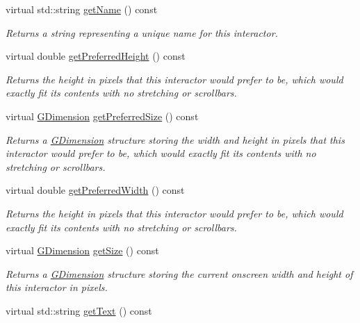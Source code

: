 \begin{DoxyCompactItemize}
virtual std\+::string \mbox{\hyperlink{classsgl_1_1GInteractor_a8a60438a5b55d0b2ceb35c8674b9d8c5}{get\+Name}} () const
\begin{DoxyCompactList}\small\item\em Returns a string representing a unique name for this interactor. \end{DoxyCompactList}\item 
virtual double \mbox{\hyperlink{classsgl_1_1GInteractor_a747de0961653847bdc6615dbf756d715}{get\+Preferred\+Height}} () const
\begin{DoxyCompactList}\small\item\em Returns the height in pixels that this interactor would prefer to be, which would exactly fit its contents with no stretching or scrollbars. \end{DoxyCompactList}\item 
virtual \mbox{\hyperlink{structsgl_1_1GDimension}{G\+Dimension}} \mbox{\hyperlink{classsgl_1_1GInteractor_a4aabbee761d8e9116275401131b7ccd1}{get\+Preferred\+Size}} () const
\begin{DoxyCompactList}\small\item\em Returns a \mbox{\hyperlink{structsgl_1_1GDimension}{G\+Dimension}} structure storing the width and height in pixels that this interactor would prefer to be, which would exactly fit its contents with no stretching or scrollbars. \end{DoxyCompactList}\item 
virtual double \mbox{\hyperlink{classsgl_1_1GInteractor_a82bca31d37700fb0e35d2743352efd5e}{get\+Preferred\+Width}} () const
\begin{DoxyCompactList}\small\item\em Returns the height in pixels that this interactor would prefer to be, which would exactly fit its contents with no stretching or scrollbars. \end{DoxyCompactList}\item 
virtual \mbox{\hyperlink{structsgl_1_1GDimension}{G\+Dimension}} \mbox{\hyperlink{classsgl_1_1GInteractor_a7b4eec96a2bdc6420695d5796a78eea9}{get\+Size}} () const
\begin{DoxyCompactList}\small\item\em Returns a \mbox{\hyperlink{structsgl_1_1GDimension}{G\+Dimension}} structure storing the current onscreen width and height of this interactor in pixels. \end{DoxyCompactList}\item 
virtual std\+::string \mbox{\hyperlink{classsgl_1_1GRadioButton_aff553c50924b836c29f146ed34a7c6ec}{get\+Text}} () const

\end{DoxyCompactItemize}
